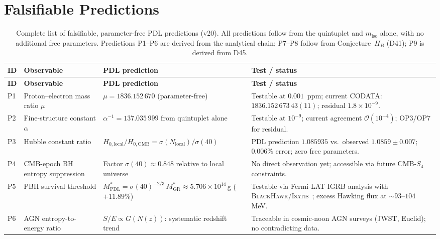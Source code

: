 \documentclass[11pt,a4paper]{article}
\theoremstyle{plain}
\theoremstyle{definition}
\theoremstyle{remark}
\begin{document}
\newpage

\section{Falsifiable Predictions}
\label{sec:predictions}

\begin{longtable}{L{0.5cm}L{3.2cm}L{5.2cm}L{4.2cm}}
\caption{Complete list of falsifiable, parameter-free PDL predictions (v20). All predictions follow from the quintuplet and $m_{\mathrm{iso}}$ alone, with no additional free parameters. Predictions P1--P6 are derived from the analytical chain; P7--P8 follow from Conjecture~$H_B$ (D41); P9 is derived from D45.}
\label{tab:predictions}\\
\toprule
\textbf{ID} & \textbf{Observable} & \textbf{PDL prediction} & \textbf{Test / status}\\
\midrule
\endfirsthead
\toprule
\textbf{ID} & \textbf{Observable} & \textbf{PDL prediction} & \textbf{Test / status}\\
\midrule
\endhead
\bottomrule
\endfoot
P1 & Proton--electron mass ratio $\mu$ & $\mu=1836.152\,670$ (parameter-free) & Testable at $0.001$~ppm; current CODATA: $1836.152\,673\,43(11)$; residual $1.8\times10^{-9}$.\\[0.4em]
P2 & Fine-structure constant $\alpha$ & $\alpha^{-1}=137.035\,999$ from quintuplet alone & Testable at $10^{-9}$; current agreement $\mathcal{O}(10^{-4})$; OP3/OP7 for residual.\\[0.4em]
P3 & Hubble constant ratio & $H_{0,\mathrm{local}}/H_{0,\mathrm{CMB}}=\sigma(N_{\mathrm{local}})/\sigma(40)$ & PDL prediction $1.085935$ vs.\ observed $1.0859\pm0.007$; $0.006\%$ error; zero free parameters.\\[0.4em]
P4 & CMB-epoch BH entropy suppression & Factor $\sigma(40)\approx 0.848$ relative to local universe & No direct observation yet; accessible via future CMB-$S_4$ constraints.\\[0.4em]
P5 & PBH survival threshold & $M^*_{\mathrm{PDL}}=\sigma(40)^{-2/3}\,M^*_{\mathrm{GR}}\approx 5.706\times10^{14}$\,g ($+11.89\%$) & Testable via Fermi-LAT IGRB analysis with \textsc{BlackHawk}/\textsc{Isatis}~\cite{D45}; excess Hawking flux at $\sim93$--$104$\,MeV.\\[0.4em]
P6 & AGN entropy-to-energy ratio & $S/E\propto G(N(z))$: systematic redshift trend & Traceable in cosmic-noon AGN surveys (JWST, Euclid); no contradicting data.\\[0.4em]

\end{longtable}
\end{document}
